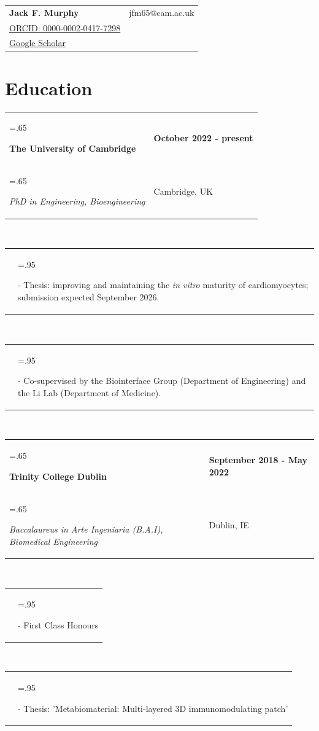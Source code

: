 \documentclass[a4paper,11pt]{article}
\newcommand{\itemHeadings}[4]{
    \begin{tabularx}{\textwidth} {>{\hsize=.65\textwidth\raggedright\arraybackslash}X
   >{\raggedleft\arraybackslash}X}
      #1 & \small#2 \\
      #3 & \small#4
    \end{tabularx}
    \\
}
\newcommand{\itemitems}[1]{
    \begin{tabularx}{\textwidth} {>{\raggedleft\arraybackslash}X >{\hsize=.95\textwidth\raggedright\arraybackslash}X}
      &- \small#1 \\
    \end{tabularx}
    \\
}
\newcommand{\heading}[2]{
    \hspace{-15mm}
    \begin{tabular}{p{.4\textwidth} >{\raggedleft}p{.57\textwidth}}
        \textbf{\Huge{#1}}\vspace{5mm} & #2 \\ %
    \end{tabular}
}
\newcommand{\sect}[1]{
    \vspace{-.4em}
    \section*{#1}
    \vspace{-3.5mm}
}
\begin{document}
\heading
    {Jack F. Murphy}
    {jfm65@cam.ac.uk \\ \href{https://orcid.org/0000-0002-0417-7298}{ORCID: 0000-0002-0417-7298} \\ \href{https://scholar.google.com/citations?user=RwMPs-8AAAAJ}{Google Scholar}}


\sect{Education}
    \itemHeadings
        {\textbf{The University of Cambridge}}
        {\textbf{October 2022 - present}}
        {\hspace{5pt}\emph{PhD in Engineering, Bioengineering}}
        {Cambridge, UK}
        \itemitems
            {Thesis: improving and maintaining the \emph{in vitro} maturity of cardiomyocytes; submission expected September 2026.}
        \itemitems
            {Co-supervised by the Biointerface Group (Department of Engineering) and the Li Lab (Department of Medicine).}
    \itemHeadings
        {\textbf{Trinity College Dublin}}
        {\textbf{September 2018 - May 2022}}
        {\hspace{5pt}\emph{Baccalaureus in Arte Ingeniaria (B.A.I), Biomedical Engineering}}
        {Dublin, IE}
        \itemitems
            {First Class Honours}
        \itemitems
            {Thesis: 'Metabiomaterial: Multi-layered 3D immunomodulating patch'}

\end{document}
